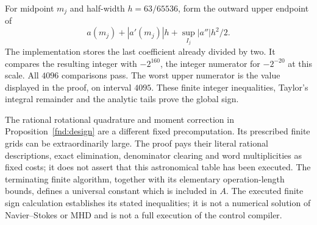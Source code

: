 \documentclass[11pt,a4paper]{amsart}
\theoremstyle{definition}
\theoremstyle{remark}
\numberwithin{equation}{section}
\begin{document}
For midpoint $m_j$ and half-width $h=63/65536$, form the outward upper endpoint of
\[
 a(m_j)+|a'(m_j)|h+\sup_{I_j}|a''|h^2/2.
\]
The implementation stores the last coefficient already divided by two. It compares the resulting integer with $-2^{160}$, the integer numerator for $-2^{-20}$ at this scale. All $4096$ comparisons pass. The worst upper numerator is the value displayed in the proof, on interval $4095$. These finite integer inequalities, Taylor's integral remainder and the analytic tails prove the global sign.

The rational rotational quadrature and moment correction in Proposition~\ref{fnd:design} are a different fixed precomputation. Its prescribed finite grids can be extraordinarily large. The proof pays their literal rational descriptions, exact elimination, denominator clearing and word multiplicities as fixed costs; it does not assert that this astronomical table has been executed. The terminating finite algorithm, together with its elementary operation-length bounds, defines a universal constant which is included in $A$. The executed finite sign calculation establishes its stated inequalities; it is not a numerical solution of Navier--Stokes or MHD and is not a full execution of the control compiler.
\end{document}
